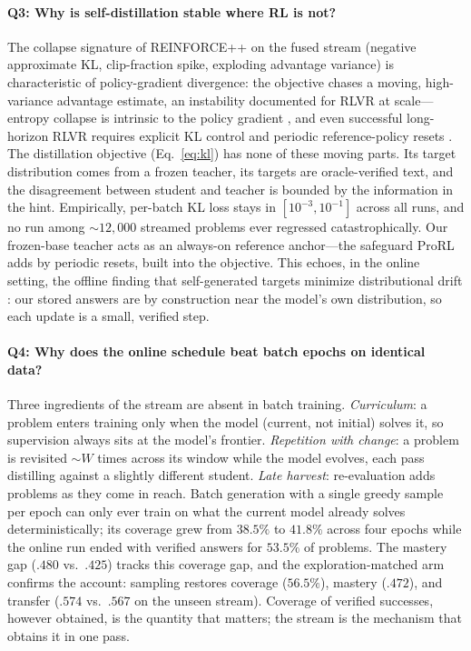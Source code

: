 \paragraph{Q3: Why is self-distillation stable where RL is not?}
The collapse signature of REINFORCE++ on the fused stream (negative approximate
KL, clip-fraction spike, exploding advantage variance) is characteristic of
policy-gradient divergence: the objective chases a moving, high-variance
advantage estimate, an instability documented for RLVR at scale---entropy
collapse is intrinsic to the policy gradient \citep{cui2025entropy}, and even
successful long-horizon RLVR requires explicit KL control and periodic
reference-policy resets \citep{liu2025prorl}. The distillation objective (Eq.~\ref{eq:kl}) has none of
these moving parts. Its target distribution comes from a frozen teacher, its targets are
oracle-verified text, and the disagreement between student and teacher is
bounded by the information in the hint. Empirically, per-batch KL
loss stays in $[10^{-3}, 10^{-1}]$ across all runs, and no run among
${\sim}12{,}000$ streamed problems ever regressed catastrophically. Our frozen-base teacher acts as an always-on
reference anchor---the safeguard ProRL adds by periodic resets, built into the
objective. This echoes, in the online setting, the offline finding that
self-generated targets minimize distributional drift
\citep{yang2024selfdistillation}: our stored answers are
by construction near the model's own distribution, so each update is a small,
verified step.


\paragraph{Q4: Why does the online schedule beat batch epochs on identical data?}
Three ingredients of the stream are absent in batch training. \emph{Curriculum}:
a problem enters training only when the model (current, not initial) solves it,
so supervision always sits at the model's frontier. \emph{Repetition with
change}: a problem is revisited ${\sim}W$ times across its window while the
model evolves, each pass distilling against a slightly different student.
\emph{Late harvest}: re-evaluation adds problems as they come in reach. Batch
generation with a single greedy sample per epoch can only ever train on what the
current model already solves deterministically; its coverage grew from $38.5\%$
to $41.8\%$ across four epochs while the online run ended with verified answers
for $53.5\%$ of problems. The mastery gap ($.480$ vs.\ $.425$) tracks this coverage gap, and the
exploration-matched arm confirms the account: sampling restores coverage
($56.5\%$), mastery ($.472$), and transfer ($.574$ vs.\ $.567$ on the unseen
stream). Coverage of verified successes, however obtained, is the quantity
that matters; the stream is the mechanism that obtains it in one pass.

